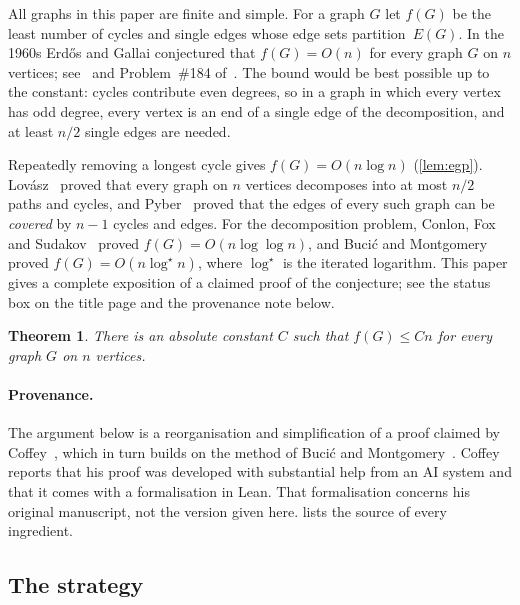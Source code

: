 \documentclass[11pt]{article}
\newtheorem{theorem}{Theorem}[section]
\theoremstyle{definition}
\theoremstyle{remark}
\numberwithin{equation}{section}
\numberwithin{figure}{section}
\numberwithin{table}{section}
\begin{document}
All graphs in this paper are finite and simple. For a graph $G$ let $f(G)$ be
the least number of cycles and single edges whose edge sets partition~$E(G)$.
In the 1960s Erd\H{o}s and Gallai conjectured that $f(G)=O(n)$ for every graph
$G$ on $n$ vertices; see~\cite{EGP} and Problem~\#184 of~\cite{Bloom}. The bound
would be best possible up to the constant: cycles contribute even degrees, so
in a graph in which every vertex has odd degree, every vertex is an end of a
single edge of the decomposition, and at least $n/2$ single edges are needed.

Repeatedly removing a longest cycle gives $f(G)=O(n\log n)$ (\cref{lem:egp}).
Lov\'asz~\cite{Lov} proved that every graph on $n$ vertices decomposes into at
most $n/2$ paths and cycles, and Pyber~\cite{Pyb} proved that the edges of
every such graph can be \emph{covered} by $n-1$ cycles and edges. For the
decomposition problem, Conlon, Fox and Sudakov~\cite{CFS} proved
$f(G)=O(n\log\log n)$, and Buci\'c and Montgomery~\cite{BM} proved
$f(G)=O(n\log^\star n)$, where $\log^\star$ is the iterated logarithm. This
paper gives a complete exposition of a claimed proof of the conjecture; see the
status box on the title page and the provenance note below.

\begin{theorem}\label{thm:main}
There is an absolute constant $C$ such that $f(G)\le Cn$ for every graph $G$ on
$n$ vertices.
\end{theorem}

\paragraph{Provenance.} The argument below is a reorganisation and
simplification of a proof claimed by Coffey~\cite{Cof}, which in turn builds on
the method of Buci\'c and Montgomery~\cite{BM}. Coffey reports that his proof
was developed with substantial help from an AI system and that it comes with a
formalisation in Lean. That formalisation concerns his original manuscript, not
the version given here.  lists the source of every
ingredient.

\subsection{The strategy}\label{sec:strategy}
\end{document}
